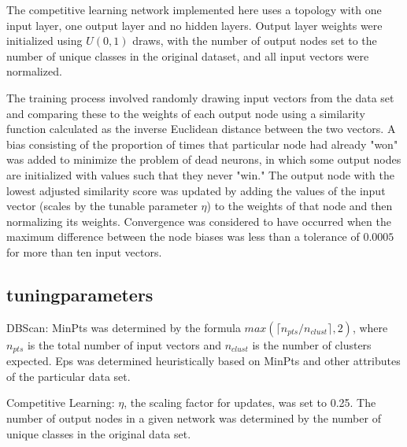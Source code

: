 \documentclass[12pt]{article}
\begin{document}
The competitive learning network implemented here uses a topology with one input layer, one output layer and no hidden layers.  Output layer weights were initialized using $U(0,1)$ draws, with the number of output nodes set to the number of unique classes in the original dataset, and all input vectors were normalized.  

The training process involved randomly drawing input vectors from the data set and comparing these to the weights of each output node using a similarity function calculated as the inverse Euclidean distance between the two vectors.  A bias consisting of the proportion of times that particular node had already "won" was added to minimize the problem of dead neurons, in which some output nodes are initialized with values such that they never "win."  The output node with the lowest adjusted similarity score was updated by adding the values of the input vector (scales by the tunable parameter $\eta$) to the weights of that node and then normalizing its weights.  Convergence was considered to have occurred when the maximum difference between the node biases was less than a tolerance of $0.0005$ for more than ten input vectors.

\subsection{tuningparameters}
DBScan:
MinPts was determined by the formula $max(\lceil n_{pts}/n_{clust} \rceil ,2)$, where $n_{pts}$ is the total number of input vectors and $n_{clust}$ is the number of clusters expected.  Eps was determined heuristically based on MinPts and other attributes of the particular data set. 

Competitive Learning:
$\eta$, the scaling factor for updates, was set to 0.25.  The number of output nodes in a given network was determined by the number of unique classes in the original data set.
\end{document}
